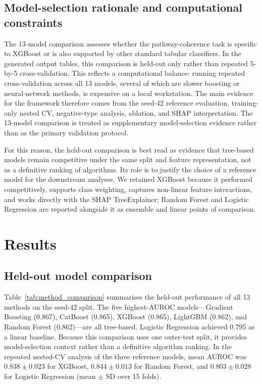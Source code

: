 \documentclass[12pt,twoside]{article}
\begin{document}
\subsection{Model-selection rationale and computational constraints}
\label{sec:methods_model_rationale}

The 13-model comparison assesses whether the pathway-coherence task is specific to XGBoost or is also supported by other standard tabular classifiers. In the generated output tables, this comparison is held-out only rather than repeated 5-by-5 cross-validation. This reflects a computational balance: running repeated cross-validation across all 13 models, several of which are slower boosting or neural-network methods, is expensive on a local workstation. The main evidence for the framework therefore comes from the seed-42 reference evaluation, training-only nested CV, negative-type analysis, ablation, and SHAP interpretation. The 13-model comparison is treated as supplementary model-selection evidence rather than as the primary validation protocol.

For this reason, the held-out comparison is best read as evidence that tree-based models remain competitive under the same split and feature representation, not as a definitive ranking of algorithms. Its role is to justify the choice of a reference model for the downstream analyses. We retained XGBoost because it performed competitively, supports class weighting, captures non-linear feature interactions, and works directly with the SHAP TreeExplainer; Random Forest and Logistic Regression are reported alongside it as ensemble and linear points of comparison.


\section{Results}
\label{sec:results}

\subsection{Held-out model comparison}
\label{sec:res_model_comparison}

Table~\ref{tab:method_comparison} summarises the held-out performance of all 13 methods on the seed-42 split. The five highest-AUROC models---Gradient Boosting (0.867), CatBoost (0.865), XGBoost (0.865), LightGBM (0.862), and Random Forest (0.862)---are all tree-based. Logistic Regression achieved 0.795 as a linear baseline. Because this comparison uses one outer-test split, it provides model-selection context rather than a definitive algorithm ranking. In the repeated nested-CV analysis of the three reference models, mean AUROC was $0.838 \pm 0.023$ for XGBoost, $0.844 \pm 0.013$ for Random Forest, and $0.803 \pm 0.028$ for Logistic Regression (mean $\pm$ SD over 15 folds).
\end{document}
